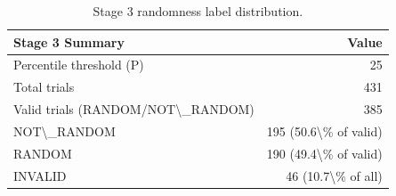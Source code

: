 \begin{table}[t]
\centering
\caption{Stage 3 randomness label distribution.}
\label{tab:label-distribution}
\begin{tabular}{lr}
\hline
Stage 3 Summary & Value \\ \hline
Percentile threshold (P) & 25 \\ \hline
Total trials & 431 \\ \hline
Valid trials (RANDOM/NOT\textbackslash{}\_RANDOM) & 385 \\ \hline
NOT\textbackslash{}\_RANDOM & 195 (50.6\textbackslash{}\% of valid) \\ \hline
RANDOM & 190 (49.4\textbackslash{}\% of valid) \\ \hline
INVALID & 46 (10.7\textbackslash{}\% of all) \\ \hline
\end{tabular}
\end{table}
